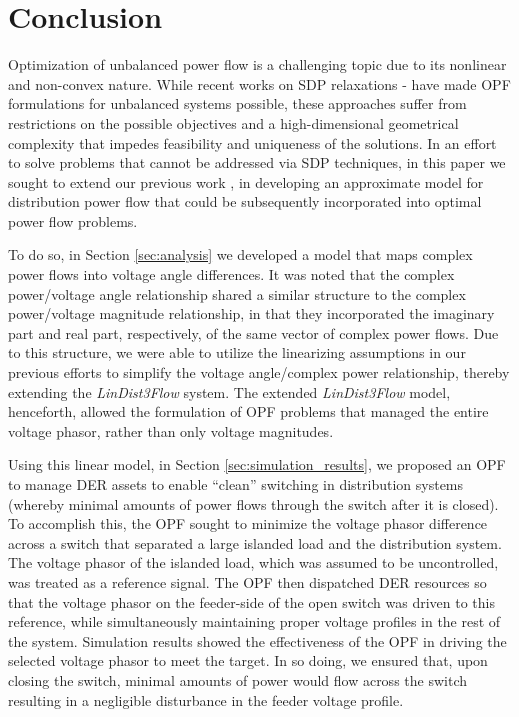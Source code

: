 \section{Conclusion}
\label{sec:conclusion}

Optimization of unbalanced power flow is a challenging topic due to its nonlinear and non-convex nature. While recent works on SDP relaxations  \cite{dall2012optimization} - \cite{dall2013distributed} have made OPF formulations for unbalanced systems possible, these approaches suffer from restrictions on the possible objectives and a high-dimensional geometrical complexity that impedes feasibility and uniqueness of the solutions.  In an effort to solve problems that cannot be addressed via SDP techniques, in this paper we sought to extend our previous work \cite{arnold2015optimal}, \cite{sankur2016linear} in developing an approximate model for distribution power flow that could be subsequently incorporated into optimal power flow problems.  

To do so, in Section \ref{sec:analysis} we developed a model that maps complex power flows into voltage angle differences.  It was noted that the complex power/voltage angle relationship shared a similar structure to the complex power/voltage magnitude relationship, in that they incorporated the imaginary part and real part, respectively, of the same vector of complex power flows. Due to this structure, we were able to utilize the linearizing assumptions in our previous efforts to simplify the voltage angle/complex power relationship, thereby extending the \emph{LinDist3Flow} system. The extended \emph{LinDist3Flow} model, henceforth, allowed the formulation of OPF problems that managed the entire voltage phasor, rather than only voltage magnitudes.  

Using this linear model, in Section \ref{sec:simulation_results}, we proposed an OPF to manage DER assets to enable ``clean'' switching in distribution systems (whereby minimal amounts of power flows through the switch after it is closed).  To accomplish this, the OPF sought to minimize the voltage phasor difference across a switch that separated a large islanded load and the distribution system.  The voltage phasor of the islanded load, which was assumed to be uncontrolled, was treated as a reference signal. The OPF then dispatched DER resources so that the voltage phasor on the feeder-side of the open switch was driven to this reference, while simultaneously maintaining proper voltage profiles in the rest of the system.  Simulation results showed the effectiveness of the OPF in driving the selected voltage phasor to meet the target.  In so doing, we ensured that, upon closing the switch, minimal amounts of power would flow across the switch resulting in a negligible disturbance in the feeder voltage profile. 

